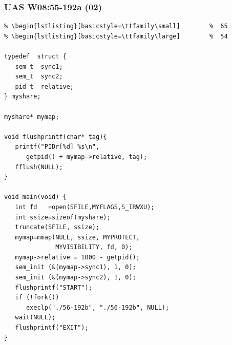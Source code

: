 \documentclass[xcolor=table, notheorems, hyperref={pdfpagelabels=false}]{beamer}
\begin{document}
\begin{frame}[fragile]
\frametitle{UAS W08:55-192a (02)}
\begin{lstlisting}[basicstyle=\ttfamily\tiny]         % 108
% \begin{lstlisting}[basicstyle=\ttfamily\footnotesize] %  72
% \begin{lstlisting}[basicstyle=\ttfamily\small]        %  65
% \begin{lstlisting}[basicstyle=\ttfamily\large]        %  54

typedef  struct {
   sem_t  sync1;
   sem_t  sync2;
   pid_t  relative;
} myshare;

myshare* mymap;

void flushprintf(char* tag){
   printf("PIDr[%d] %s\n", 
      getpid() + mymap->relative, tag);
   fflush(NULL);
}

void main(void) {
   int fd   =open(SFILE,MYFLAGS,S_IRWXU);
   int ssize=sizeof(myshare);
   truncate(SFILE, ssize);
   mymap=mmap(NULL, ssize, MYPROTECT, 
              MYVISIBILITY, fd, 0);
   mymap->relative = 1000 - getpid();
   sem_init (&(mymap->sync1), 1, 0);
   sem_init (&(mymap->sync2), 1, 0);
   flushprintf("START");
   if (!fork())
      execlp("./56-192b", "./56-192b", NULL);
   wait(NULL);
   flushprintf("EXIT");
}

\end{lstlisting}
\end{frame}

\end{document}

